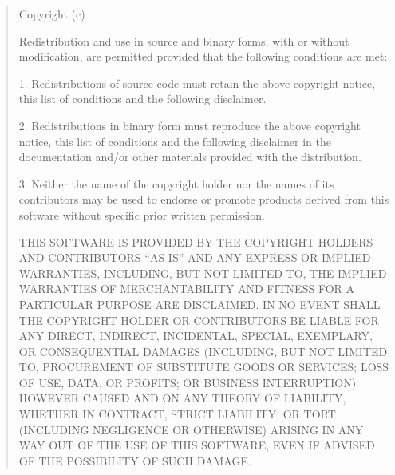 \expandafter\def\csname qthesis@licensetext@BSD-3-Clause\endcsname{%
  \begin{quote}\small\raggedright
    Copyright (c) \ifstrempty{\qthesis@licenseyear}{\number\year}{\qthesis@licenseyear}\ %
    \ifstrempty{\qthesis@copyrightholder}{\qthesis@author}{\qthesis@copyrightholder}

    Redistribution and use in source and binary forms, with or without modification, are permitted provided that the following conditions are met:

    1. Redistributions of source code must retain the above copyright notice, this list of conditions and the following disclaimer.

    2. Redistributions in binary form must reproduce the above copyright notice, this list of conditions and the following disclaimer in the documentation and/or other materials provided with the distribution.

    3. Neither the name of the copyright holder nor the names of its contributors may be used to endorse or promote products derived from this software without specific prior written permission.

    THIS SOFTWARE IS PROVIDED BY THE COPYRIGHT HOLDERS AND CONTRIBUTORS ``AS IS'' AND ANY EXPRESS OR IMPLIED WARRANTIES, INCLUDING, BUT NOT LIMITED TO, THE IMPLIED WARRANTIES OF MERCHANTABILITY AND FITNESS FOR A PARTICULAR PURPOSE ARE DISCLAIMED. IN NO EVENT SHALL THE COPYRIGHT HOLDER OR CONTRIBUTORS BE LIABLE FOR ANY DIRECT, INDIRECT, INCIDENTAL, SPECIAL, EXEMPLARY, OR CONSEQUENTIAL DAMAGES (INCLUDING, BUT NOT LIMITED TO, PROCUREMENT OF SUBSTITUTE GOODS OR SERVICES; LOSS OF USE, DATA, OR PROFITS; OR BUSINESS INTERRUPTION) HOWEVER CAUSED AND ON ANY THEORY OF LIABILITY, WHETHER IN CONTRACT, STRICT LIABILITY, OR TORT (INCLUDING NEGLIGENCE OR OTHERWISE) ARISING IN ANY WAY OUT OF THE USE OF THIS SOFTWARE, EVEN IF ADVISED OF THE POSSIBILITY OF SUCH DAMAGE.
  \end{quote}%
}

